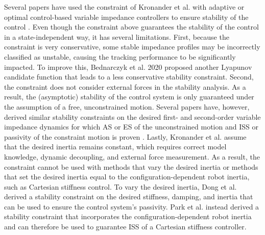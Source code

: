 Several papers have used the constraint of Kronander et al. \cite{kronanderStabilityConsiderationsVariable2016} with adaptive or optimal control-based variable impedance controllers to ensure stability of the control \cite{fontanelliComparisonAssistiveMethods2018,liuAdaptiveEnhancedAdmittance2022,liangAdaptiveTimeVaryingImpedance2022,heVariableImpedanceControl2020,dongAdaptiveStiffnessDamping2019}. Even though the constraint above guarantees the stability of the control in a state-independent way, it has several limitations. First, because the constraint is very conservative, some stable impedance profiles may be incorrectly classified as unstable, causing the tracking performance to be significantly impacted. To improve this, Bednarczyk et al. 2020 \cite{bednarczykPassivityFilterVariable2020} proposed another Lyapunov candidate function that leads to a less conservative stability constraint. Second, the constraint does not consider external forces in the stability analysis. As a result, the (asymptotic) stability of the control system is only guaranteed under the assumption of a free, unconstrained motion. Several papers have, however, derived similar stability constraints on the desired first- and second-order variable impedance dynamics for which AS or ES of the unconstrained motion and ISS or passivity of the constraint motion is proven
\cite{parkInputtoStateStabilityVariable2020,sunStabilityGuaranteedVariableImpedance2021,zhangNeuralApproximationbasedAdaptive2020,bednarczykPassivityFilterVariable2020}. Lastly, Kronander et al. \cite{kronanderStabilityConsiderationsVariable2016} assume that the desired inertia remains constant, which requires correct model knowledge, dynamic decoupling, and external force measurement. As a result, the constraint cannot be used with methods that vary the desired inertia or methods that set the desired inertia equal to the configuration-dependent robot inertia, such as Cartesian stiffness control. To vary the desired inertia, Dong et al. \cite{dongUDEBasedVariableImpedance2019} derived a stability constraint on the desired stiffness, damping, and inertia that can be used to ensure the control system's passivity. Park et al. \cite{parkInputtoStateStabilityVariable2020} instead derived a stability constraint that incorporates the configuration-dependent robot inertia and can therefore be used to guarantee ISS of a Cartesian stiffness controller.
